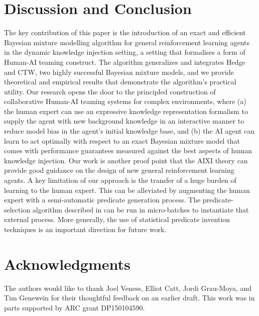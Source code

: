 \documentclass[letterpaper]{article} %
\theoremstyle{definition}
\begin{document}
\section{Discussion and Conclusion}

The key contribution of this paper is the introduction of an exact and efficient Bayesian mixture modelling algorithm for general reinforcement learning agents in the dynamic knowledge injection setting, a setting that formalises a form of Human-AI teaming construct. The algorithm generalizes and integrates Hedge and CTW, two highly successful Bayesian mixture models, and we provide theoretical and empirical results that demonstrate the algorithm's practical utility. Our research opens the door to the principled construction of collaborative Human-AI teaming systems for complex environments, where (a) the human expert can use an expressive knowledge representation formalism to supply the agent with new background knowledge in an interactive manner to reduce model bias in the agent's initial knowledge base, and (b) the AI agent can learn to act optimally with respect to an exact Bayesian mixture model that comes with performance guarantees measured against the best aspects of human knowledge injection. Our work is another proof point that the AIXI theory can provide good guidance on the design of new general reinforcement learning agents. A key limitation of our approach is the transfer of a huge burden of learning to the human expert. This can be alleviated by augmenting the human expert with a semi-automatic predicate generation process. The predicate-selection algorithm described in \cite{yang-zhao2022a} can be run in micro-batches to instantiate that external process. More generally, the use of statistical predicate invention \cite{CropperMM20,KokD07} techniques is an important direction for future work.



\section{Acknowledgments}
The authors would like to thank Joel Veness, Elliot Catt, Jordi Grau-Moya, and Tim Genewein for their thoughtful feedback on an earlier draft. This work was in parts supported by ARC grant DP150104590.



\ifarxiv
\appendix

\fi
\end{document}
